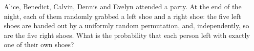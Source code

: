 Alice, Benedict, Calvin, Dennis and Evelyn attended a party. At the end of the night, each of them randomly grabbed a left shoe and a right shoe: the five left shoes are handed out by a uniformly random permutation, and, independently, so are the five right shoes. What is the probability that each person left with exactly one of their own shoes?
